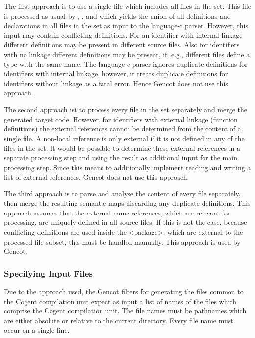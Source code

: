 The first approach is to use a single file which includes all files in the set. This file is processed as usual by
, , and  which yields the union of all definitions
and declarations in all files in the set as input to the language-c parser. However, this input may contain conflicting
definitions. For an identifier with internal linkage different definitions may be present in different source files.
Also for identifiers with no linkage different definitions may be present, if, e.g., different  files define
a type with the same name. The language-c parser ignores duplicate definitions for identifiers with internal linkage,
however, it treats duplicate definitions for identifiers without linkage as a fatal error. Hence Gencot does not use
this approach.

The second approach ist to process every file in the set separately and merge the generated target code. However, for
identifiers with external linkage (function definitions) the external references cannot be determined from the content
of a single file. A non-local reference is only external if it is not defined in any of the files in the set. It would
be possible to determine these external references in a separate processing step and using the result as additional input
for the main processing step. Since this means to additionally implement reading and writing a list of external references,
Gencot does not use this approach.

The third approach is to parse and analyse the content of every file separately, then merge the resulting semantic maps
discarding any duplicate definitions. This approach assumes that the external name references, which are relevant for
processing, are uniquely defined in all source files. If this is not the case, because conflicting definitions are used
inside the <package>, which are external to the processed file subset, this must be handled manually. 
This approach is used by Gencot.

\subsubsection{Specifying Input Files}

Due to the approach used, the Gencot filters for generating the files common to the Cogent compilation unit expect
as input a list of names of the files which comprise the Cogent compilation unit. The file names must be pathnames which are either 
absolute or relative to the current directory. Every file name must occur on a single line.

